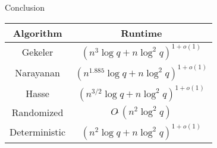 \documentclass{beamer}
\begin{document}













    



\begin{frame}{Conclusion}

\begin{table}[]
\begin{tabular}{|c|c|}
\hline
Algorithm & Runtime  \\ \hline
Gekeler &  $(n^{3}\log
  q + n \log^2 q)^{1+o(1)}$ \\
Narayanan & $(n^{1.885} \log q + n \log^2 q)^{1+o(1)}$  \\
Hasse & $(n^{3/2} \log q + n \log^2 q)^{1+o(1)}$  \\
Randomized & $O\tilde{~}(n^2 \log^2 q)$  \\
Deterministic & $(n^2 \log q + n \log^2 q)^{1+o(1)}$ \\ \hline
\end{tabular}
\end{table}
    
\end{frame}
\end{document}

